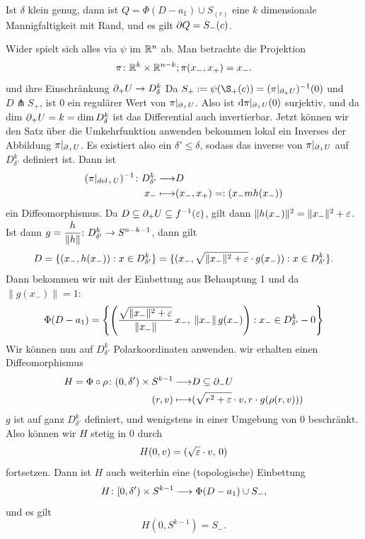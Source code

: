 \begin{bigproof}
    \begin{claim}
        Ist $\delta$ klein genug, dann ist $Q = \Phi (D - a_1) \cup S_(c)$ eine $k$ dimensionale 
        Mannigfaltigkeit mit Rand, und es gilt ${ \partial } Q = S_- (c)$.
    \end{claim}

    \begin{smallproof}
        Wider spielt sich alles via $\psi$ im ${ \mathbb R }^n$ ab.
        Man betrachte die Projektion
        \[ \pi \colon { \mathbb R }^k \times { \mathbb R }^{n - k} ; \pi (x_-, x_+) = x_- . \]
        und ihre Einschränkung ${ \partial }_+U \to D_{\delta}^k$
         Da $S_+ := \psi(\S_+(c)) = (\pi|_{\del_+U})^{-1}(0)$
        und $D \pitchfork S_+$, ist $0$ ein regulärer Wert von $\pi|_{{ \partial }_+U}$.
        Also ist ${ \operatorname{d} } \pi|_{{ \partial }_+U} (0)$ surjektiv, und da dim ${ \partial }_+U = k = \dim D^k_{\delta}$ ist
        das Differential auch invertierbar. Jetzt können wir den Satz über die Umkehrfunktion anwenden 
        bekommen lokal ein Inverses der Abbildung $\pi|_{{ \partial }_+U}$. Es existiert also ein 
        $\delta' \leq \delta$, sodass das inverse von $\pi|_{{ \partial }_+U}$ auf $D^k_{\delta'}$ definiert ist.
        Dann ist 
        \begin{align*}
            (\pi|_{del_+U})^{-1} \colon D^k_{\delta'} \longrightarrow & D \\
            x_- \longmapsto & (x_-, x_+) =: (x_-m h(x_-))
        \end{align*}
        ein Diffeomorphismus. Da $D \subseteq { \partial }_+U \subseteq f^{-1}(\varepsilon)$, gilt dann 
        $\| h(x_-) \|^2 = \| x_- \|^2 + \varepsilon $. Ist dann 
        $g = \cfrac{h}{\| h \|} \colon D^k_{\delta'} \to S^{n - k - 1}$, dann gilt
        \[ D = \{ (x_-, h(x_-)): x \in D^k_{\delta'} \} 
            = \{ (x_-, \sqrt{\| x_- \|^2 + \varepsilon} \cdot g(x_-)): x \in D^k_{\delta'} \} . \]
        Dann bekommen wir mit der Einbettung aus Behauptung 1 und da $\| g(x_-) \| = 1$:
        \[ \Phi(D - a_1) = 
            \left\{ \left( \frac{\sqrt{\| x_- \|^2 + \varepsilon}}{\| x_- \|} \, x_-, \; 
                    \| x_- \| \, g(x_-) \right) : 
                x_- \in D^k_{\delta'} - 0 \right\} \]
        Wir können nun auf $D^k_{\delta'}$ Polarkoordinaten anwenden. wir erhalten einen Diffeomorphismus
        \begin{align*}
            H = \Phi \circ \rho \colon (0, \delta') \times S^{k-1} \longrightarrow & D \subseteq { \partial }_-U \\
            (r, v) \longmapsto & ( \sqrt{r^2 + \varepsilon} \cdot v, r \cdot g(\rho(r, v)))
        \end{align*}
        $g$ ist auf ganz $D^k_{\delta'}$ definiert, und wenigstens in einer Umgebung von $0$ beschränkt.
        Also können wir $H$ stetig in $0$ durch
        \[ H(0, v) = (\sqrt{\varepsilon} \cdot v, \, 0) \]
        fortsetzen. Dann ist $H$ auch weiterhin eine (topologische) Einbettung 
        \[ H \colon [0, \delta') \times S^{k - 1} \longrightarrow \Phi(D - a_1) \cup S_- , \]
        und es gilt 
        \[ H(0, S^{k - 1}) = S_- . \]
    \end{smallproof}
\end{bigproof}

